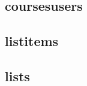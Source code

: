 \documentclass[../main.tex]{subfiles}
\begin{document}
\lipsum[2-3]


\subsection{coursesusers} %
\label{sub:coursesusers}

\begin{figure}
  \vspace{-20pt}
  \begin{center}
  \end{center}
  \vspace{-20pt}
\end{figure}

\lipsum[2-3]


\subsection{listitems} %
\label{sub:listitems}

\begin{figure}
  \vspace{-20pt}
  \begin{center}
  \end{center}
  \vspace{-20pt}
\end{figure}

\lipsum[2-3]


\subsection{lists} %
\label{sub:lists}
\end{document}
